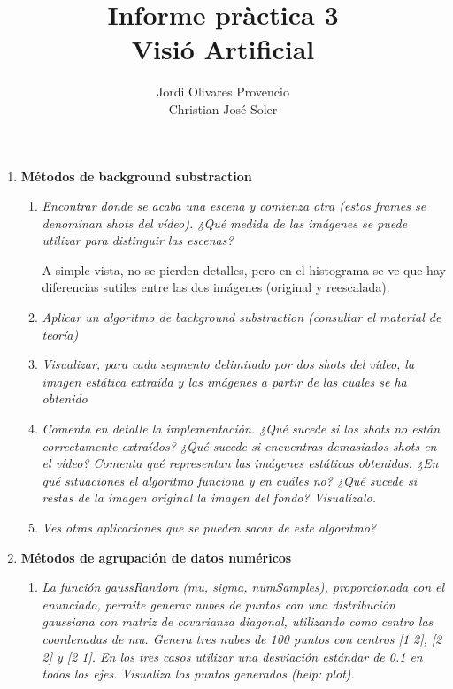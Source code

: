 \documentclass{article}
\title{Informe pràctica 3\\Visió Artificial}
\author{Jordi Olivares Provencio\\Christian José Soler}
\begin{document}
\maketitle

\begin{enumerate}

 \item \textbf{Métodos de background substraction}

 \begin{enumerate}

 \item \textit{Encontrar  donde  se  acaba  una  escena  y  comienza  otra  (estos  frames  se denominan  shots del  vídeo).  ¿Qué  medida  de  las  imágenes  se  puede utilizar para distinguir las escenas?}
 
 A simple vista, no se pierden detalles, pero en el histograma se ve que hay diferencias sutiles entre las dos imágenes (original y reescalada).

 \item \textit{Aplicar  un  algoritmo  de  background  substraction  (consultar  el  material 
de teoría)}

 \item \textit{Visualizar, para  cada  segmento  delimitado  por  dos  shots  del  vídeo,  la  imagen 
estática extraída y las imágenes a partir de las cuales se ha obtenido}

 \item \textit{Comenta  en  detalle  la  implementación.  ¿Qué  sucede  si  los  shots  no  están 
correctamente  extraídos?    ¿Qué  sucede  si  encuentras  demasiados  shots  en  el 
vídeo?  Comenta qué representan  las  imágenes  estáticas  obtenidas.  ¿En  qué 
situaciones  el  algoritmo  funciona  y  en  cuáles  no? ¿Qué  sucede  si  restas  de  la 
imagen original la imagen del fondo? Visualízalo.}

 \item \textit{Ves  otras aplicaciones que se pueden sacar de este algoritmo?}

 \end{enumerate}

\newpage

 \item \textbf{Métodos de agrupación de datos numéricos}

 \begin{enumerate}
 \item \textit{La función gaussRandom (mu, sigma, numSamples), proporcionada con el 
enunciado,  permite  generar  nubes  de  puntos  con  una  distribución 
gaussiana con matriz de covarianza diagonal, utilizando como centro las 
coordenadas de mu. Genera tres nubes de 100 puntos con centros [1 2], [2 
2]  y  [2  1].  En  los  tres  casos  utilizar  una desviación  estándar  de  0.1  en 
todos los ejes. Visualiza los puntos generados (help: plot).}


\end{enumerate}
\end{enumerate}
\end{document}
